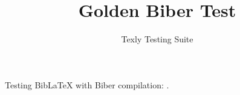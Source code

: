 \documentclass{article}
\title{Golden Biber Test}
\author{Texly Testing Suite}
\begin{document}
\maketitle

Testing BibLaTeX with Biber compilation: \cite{lamport1994}.

\printbibliography
\end{document}
